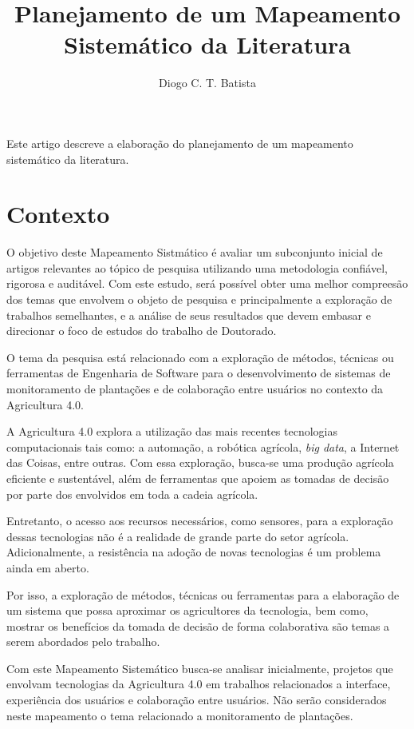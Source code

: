 \documentclass[12pt]{article}
\title{Planejamento de um Mapeamento Sistemático da Literatura}
\author{Diogo C. T. Batista\inst{1}}
\begin{document}
\maketitle

\begin{resumo}
  Este artigo descreve a elaboração do planejamento de um mapeamento sistemático da literatura.
\end{resumo}


\section{Contexto}

O objetivo deste Mapeamento Sistmático é avaliar um subconjunto inicial de artigos relevantes ao tópico de pesquisa utilizando uma metodologia confiável, rigorosa e auditável. Com este estudo, será possível obter uma melhor compreesão dos temas que envolvem o objeto de pesquisa e principalmente a exploração de trabalhos semelhantes, e a análise de seus resultados que devem embasar e direcionar o foco de estudos do trabalho de Doutorado.

O tema da pesquisa está relacionado com a exploração de métodos, técnicas ou ferramentas de Engenharia de Software para o desenvolvimento de sistemas de monitoramento de plantações e de colaboração entre usuários no contexto da Agricultura 4.0.

A Agricultura 4.0 explora a utilização das mais recentes tecnologias computacionais tais como: a automação, a robótica agrícola, \textit{big data}, a Internet das Coisas, entre outras. Com essa exploração, busca-se uma produção agrícola eficiente e sustentável, além de ferramentas que apoiem as tomadas de decisão por parte dos envolvidos em toda a cadeia agrícola.

Entretanto, o acesso aos recursos necessários, como sensores, para a exploração dessas tecnologias não é a realidade de grande parte do setor agrícola. Adicionalmente, a resistência na adoção de novas tecnologias é um problema ainda em aberto.

Por isso, a exploração de métodos, técnicas ou ferramentas para a elaboração de um sistema que possa aproximar os agricultores da tecnologia, bem como, mostrar os benefícios da tomada de decisão de forma colaborativa são temas a serem abordados pelo trabalho.

Com este Mapeamento Sistemático busca-se analisar inicialmente, projetos que envolvam tecnologias da Agricultura 4.0 em trabalhos relacionados a interface, experiência dos usuários e colaboração entre usuários. Não serão considerados neste mapeamento o tema relacionado a monitoramento de plantações.
\end{document}
